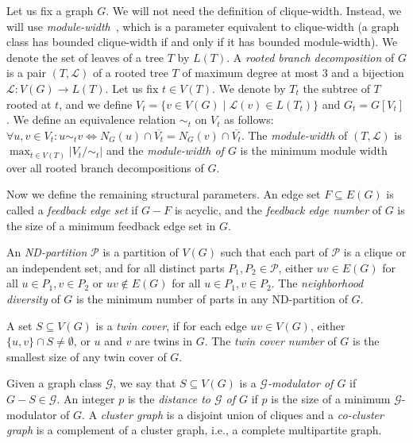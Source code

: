 \documentclass[runningheads, envcountsame]{llncs}
\newcommand{\sep}{\;|\;}
\newcommand{\seq}{\subseteq}
\newcommand{\ca}{\mathcal}
\begin{document}
Let us fix a graph $G$.
We will not need the definition of clique-width.
Instead, we will use \emph{module-width}~\cite[defined under the name modular-width]{rao2008clique}, which is a parameter equivalent to clique-width (a graph class has bounded clique-width if and only if it has bounded module-width).
We denote the set of leaves of a tree $T$ by $L(T)$.
A \emph{rooted branch decomposition} of $G$ is a pair $(T, \ca L)$ of a rooted tree $T$ of maximum degree at most 3 and a bijection $\ca L \colon V(G) \to L(T)$.
Let us fix $t \in V(T)$. We denote by $T_t$ the subtree of $T$ rooted at $t$, and we define $V_t = \{v \in V(G) \sep \ca L(v) \in L(T_t)\}$ and $G_t = G[V_t]$.
We define an equivalence relation $\sim_t$ on $V_t$ as follows: $\forall u, v \in V_t \colon u \sim_t v \Leftrightarrow N_G(u) \cap \overline{V_t} = N_G(v) \cap \overline{V_t}$.
The \emph{module-width} of $(T, \ca L)$ is $\max_{t \in V(T)} |V_t/{\sim_t}|$ and the \emph{module-width of $G$} is the minimum module width over all rooted branch decompositions of $G$.

Now we define the remaining structural parameters.
An edge set $F \seq E(G)$ is called a \emph{feedback edge set} if $G-F$ is acyclic, and the \emph{feedback edge number} of $G$ is the size of a minimum feedback edge set in $G$.

An \emph{ND-partition} $\ca P$ is a partition of $V(G)$ such that each part of $\ca P$ is a clique or an independent set, and for all distinct parts $P_1, P_2 \in \ca P$, either $uv \in E(G)$ for all $u \in P_1, v \in P_2$ or $uv \notin E(G)$ for all $u \in P_1, v \in P_2$.
The \emph{neighborhood diversity} of $G$ is the minimum number of parts in any ND-partition of $G$.

A set $S \seq V(G)$ is a \emph{twin cover}, if for each edge $uv \in V(G)$, either $\{u, v\} \cap S \ne \emptyset$, or $u$ and $v$ are twins in $G$. The \emph{twin cover number} of
$G$ is the smallest size of any twin cover of $G$.

Given a graph class $\ca G$, we say that $S\seq V(G)$ is a \emph{$\ca G$-modulator of $G$} if $G-S \in \ca G$. An integer $p$ is the \emph{distance to $\ca G$ of $G$} if $p$ is the size of a minimum $\ca G$-modulator of $G$.
A \emph{cluster graph} is a disjoint union of cliques and a \emph{co-cluster graph} is a complement of a cluster graph, i.e., a complete multipartite graph.
\end{document}
